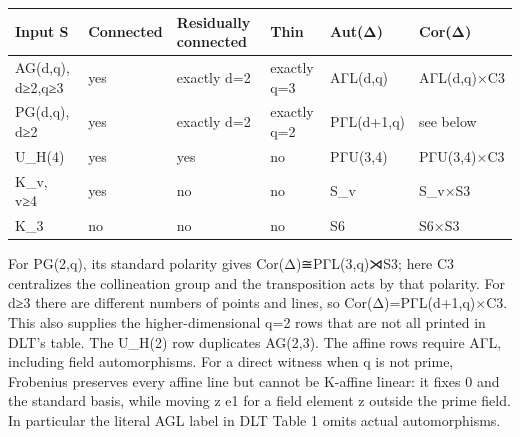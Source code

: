 \documentclass[
  11pt,
  a4paper,
]{article}
\newcounter{none} %
\begin{document}
{\def\LTcaptype{none} %
\begin{longtable}[]{@{}
  >{\raggedright\arraybackslash}p{}
  >{\centering\arraybackslash}p{}
  >{\centering\arraybackslash}p{}
  >{\centering\arraybackslash}p{}
  >{\raggedright\arraybackslash}p{}
  >{\raggedright\arraybackslash}p{}@{}}
\toprule\noalign{}
\begin{minipage}[b]{\linewidth}\raggedright
Input S
\end{minipage} & \begin{minipage}[b]{\linewidth}\centering
Connected
\end{minipage} & \begin{minipage}[b]{\linewidth}\centering
Residually connected
\end{minipage} & \begin{minipage}[b]{\linewidth}\centering
Thin
\end{minipage} & \begin{minipage}[b]{\linewidth}\raggedright
Aut(Δ)
\end{minipage} & \begin{minipage}[b]{\linewidth}\raggedright
Cor(Δ)
\end{minipage} \\
\midrule\noalign{}
\endhead
\bottomrule\noalign{}
\endlastfoot
AG(d,q), d≥2,q≥3 & yes & exactly d=2 & exactly q=3 & AΓL(d,q) &
AΓL(d,q)×C3 \\
PG(d,q), d≥2 & yes & exactly d=2 & exactly q=2 & PΓL(d+1,q) & see
below \\
U\_H(4) & yes & yes & no & PΓU(3,4) & PΓU(3,4)×C3 \\
K\_v, v≥4 & yes & no & no & S\_v & S\_v×S3 \\
K\_3 & no & no & no & S6 & S6×S3 \\
\end{longtable}
}

For PG(2,q), its standard polarity gives Cor(Δ)≅PΓL(3,q)⋊S3; here C3
centralizes the collineation group and the transposition acts by that
polarity. For d≥3 there are different numbers of points and lines, so
Cor(Δ)=PΓL(d+1,q)×C3. This also supplies the higher-dimensional q=2 rows
that are not all printed in DLT's table. The U\_H(2) row duplicates
AG(2,3). The affine rows require AΓL, including field automorphisms. For
a direct witness when q is not prime, Frobenius preserves every affine
line but cannot be K-affine linear: it fixes 0 and the standard basis,
while moving z e1 for a field element z outside the prime field. In
particular the literal AGL label in DLT Table 1 omits actual
automorphisms.
\end{document}
